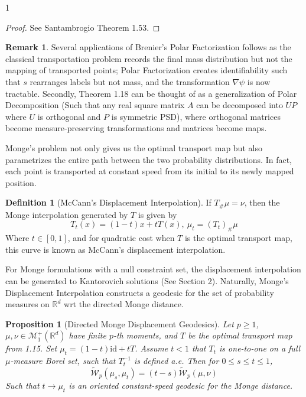 \documentclass[12pt]{article}
\newtheorem{proposition}[theorem]{Proposition}
\theoremstyle{definition}
\newtheorem{definition}[theorem]{Definition}
\newtheorem*{remark}{Remark}
\theoremstyle{plain}
\begin{document}
\begin{spacing}{1}
\begin{proof}
    See Santambrogio \cite{santambrogio} Theorem 1.53.
\end{proof}

\begin{remark}
    Several applications of Brenier's Polar Factorization follows as the classical transportation problem records the final mass distribution but not the mapping of transported points; Polar Factorization creates identifiability such that $s$ rearranges labels but not mass, and the transformation $\nabla \psi$ is now tractable. Secondly, Theorem 1.18 can be thought of as a generalization of Polar Decomposition (Such that any real square matrix $A$ can be decomposed into $UP$ where $U$ is orthogonal and $P$ is symmetric PSD), where orthogonal matrices become measure-preserving transformations and matrices become maps.
\end{remark}

Monge's problem not only gives us the optimal transport map but also parametrizes the entire path between the two probability distributions. In fact, each point is transported at constant speed from its initial to its newly mapped position. 

\begin{definition}[McCann's Displacement Interpolation]
    If $T_\#\mu = \nu$, then the Monge interpolation generated by $T$ is given by
    \[
    T_t(x) = (1-t)x+tT(x), \ \mu_t = ({T_t})_\#\mu
    \]
    Where $t \in [0, 1]$, and for quadratic cost when $T$ is the optimal transport map, this curve is known as McCann's displacement interpolation. 
\end{definition}

For Monge formulations with a null constraint set, the displacement interpolation can be generated to Kantorovich solutions (See Section 2). Naturally, Monge's Displacement Interpolation constructs a geodesic for the set of probability measures on $\mathbb{R}^d$ wrt the directed Monge distance.

\begin{proposition}[Directed Monge Displacement Geodesics]
    Let $p \geq 1$, $\mu, \nu \in \mathcal{M}_1^+(\mathbb{R}^d)$ have finite $p$-th moments, and $T$ be the optimal transport map from 1.15. Set $\mu_t = (1-t)\text{id} + tT$. Assume $t < 1$ that $T_t$ is one-to-one on a full $\mu$-measure Borel set, such that $T_t^{-1}$ is defined a.e. Then for $0 \leq s \leq t \leq 1$,
    \[
    \tilde{\mathcal{W}}_p(\mu_s, \mu_t) = (t-s)\tilde{\mathcal{W}}_p(\mu, \nu)
    \]
    Such that $t \rightarrow \mu_t$ is an oriented constant-speed geodesic for the Monge distance.
\end{proposition}


\end{spacing}
\end{document}
